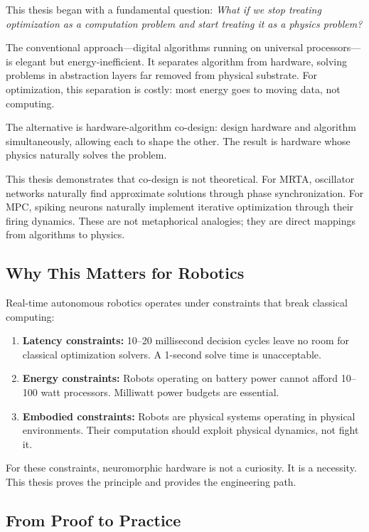 This thesis began with a fundamental question: \textit{What if we stop treating optimization as a computation problem and start treating it as a physics problem?}

The conventional approach—digital algorithms running on universal processors—is elegant but energy-inefficient. It separates algorithm from hardware, solving problems in abstraction layers far removed from physical substrate. For optimization, this separation is costly: most energy goes to moving data, not computing.

The alternative is hardware-algorithm co-design: design hardware and algorithm simultaneously, allowing each to shape the other. The result is hardware whose physics naturally solves the problem.

This thesis demonstrates that co-design is not theoretical. For MRTA, oscillator networks naturally find approximate solutions through phase synchronization. For MPC, spiking neurons naturally implement iterative optimization through their firing dynamics. These are not metaphorical analogies; they are direct mappings from algorithms to physics.

\subsection{Why This Matters for Robotics}

Real-time autonomous robotics operates under constraints that break classical computing:

\begin{enumerate}
\item \textbf{Latency constraints:} 10--20 millisecond decision cycles leave no room for classical optimization solvers. A 1-second solve time is unacceptable.

\item \textbf{Energy constraints:} Robots operating on battery power cannot afford 10--100 watt processors. Milliwatt power budgets are essential.

\item \textbf{Embodied constraints:} Robots are physical systems operating in physical environments. Their computation should exploit physical dynamics, not fight it.
\end{enumerate}

For these constraints, neuromorphic hardware is not a curiosity. It is a necessity. This thesis proves the principle and provides the engineering path.

\subsection{From Proof to Practice}

